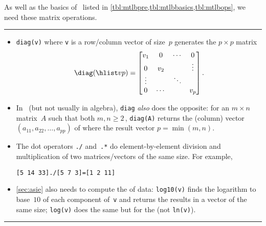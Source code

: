 \begin{table}
\caption{As well as the basics of \script\ listed in 
\cref{tbl:mtlbpre,tbl:mtlbbasics,tbl:mtlbops},  we need these matrix operations.} \label{tbl:mtlbmops}
\smallskip\hrule\smallskip
\begin{minipage}{\linewidth}
\begin{itemize}
\item {}\verb|diag(v)| where \verb|v| is a row/column vector of size~\(p\) generates the \(p\times p\) matrix 
\begin{equation*}
\diag(\hlist vp)=\begin{bmatrix} v_1&0&\cdots&0\\
0&v_2&&\vdots\\ \vdots&&\ddots\\ 0&\cdots&&v_p \end{bmatrix}.
\end{equation*}

\item In \script\ (but not usually in algebra), \verb|diag| \emph{also} does the opposite: for an \(m\times n\) matrix~\(A\) such that both \(m,n\geq2\)\,,  \verb|diag(A)| returns the (column) vector \((a_{11},a_{22},\ldots,a_{pp})\) of  where the result vector  \(p=\min(m,n)\).

\item The dot operators \verb|./| and~\verb|.*| do element-by-element division and multiplication of two matrices\slash vectors of the same size.  For example, 
\begin{verbatim}
[5 14 33]./[5 7 3]=[1 2 11]
\end{verbatim}


\item \cref{sec:asie} also needs to compute the  of data: \verb|log10(v)| finds the logarithm to base~\(10\) of each component of~\verb|v| and returns the results in a vector of the same size; \verb|log(v)| does the same but for the  (not \verb|ln(v)|).

\end{itemize}
\end{minipage}
\smallskip\hrule
\end{table}





